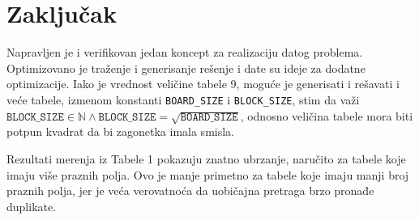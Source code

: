 \documentclass[a4paper]{article}
\begin{document}
    \section{Zaključak}
    Napravljen je i verifikovan jedan koncept za realizaciju datog problema. Optimizovano je traženje i generisanje rešenje i date su ideje za 
    dodatne optimizacije. Iako je vrednost veličine tabele 9, moguće je generisati i rešavati i veće tabele, izmenom konstanti \texttt{BOARD\_SIZE} i \texttt{BLOCK\_SIZE}, stim
    da važi $\texttt{BLOCK\_SIZE} \in \mathbb{N} \land \texttt{BLOCK\_SIZE} = \sqrt{\texttt{BOARD\_SIZE}}$, odnosno veličina tabele mora biti potpun kvadrat da bi zagonetka imala smisla.
    \par Rezultati merenja iz Tabele 1 pokazuju znatno ubrzanje, naručito za tabele koje imaju više praznih polja. Ovo je manje primetno za tabele koje imaju 
    manji broj praznih polja, jer je veća verovatnoća da uobičajna pretraga brzo pronađe duplikate. 
    \newpage
\end{document}
